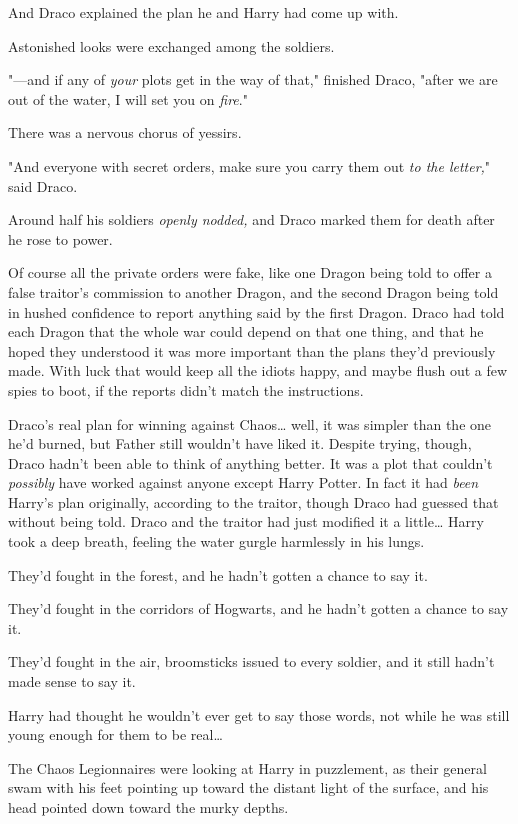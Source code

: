 And Draco explained the plan he and Harry had come up with.

Astonished looks were exchanged among the soldiers.

"---and if any of \emph{your} plots get in the way of that," finished Draco,
"after we are out of the water, I will set you on \emph{fire}."

There was a nervous chorus of yessirs.

"And everyone with secret orders, make sure you carry them out \emph{to the
letter,}" said Draco.

Around half his soldiers \emph{openly nodded,} and Draco marked them for death
after he rose to power.

Of course all the private orders were fake, like one Dragon being told to offer
a false traitor's commission to another Dragon, and the second Dragon being
told in hushed confidence to report anything said by the first Dragon. Draco
had told each Dragon that the whole war could depend on that one thing, and
that he hoped they understood it was more important than the plans they'd
previously made. With luck that would keep all the idiots happy, and maybe
flush out a few spies to boot, if the reports didn't match the instructions.

Draco's real plan for winning against Chaos{\ldots} well, it was simpler than
the one he'd burned, but Father still wouldn't have liked it. Despite trying,
though, Draco hadn't been able to think of anything better. It was a plot that
couldn't \emph{possibly} have worked against anyone except Harry Potter. In
fact it had \emph{been} Harry's plan originally, according to the traitor,
though Draco had guessed that without being told. Draco and the traitor had
just modified it a little{\ldots}
\later
Harry took a deep breath, feeling the water gurgle harmlessly in his lungs.

They'd fought in the forest, and he hadn't gotten a chance to say it.

They'd fought in the corridors of Hogwarts, and he hadn't gotten a chance to
say it.

They'd fought in the air, broomsticks issued to every soldier, and it still
hadn't made sense to say it.

Harry had thought he wouldn't ever get to say those words, not while he was
still young enough for them to be real{\ldots}

The Chaos Legionnaires were looking at Harry in puzzlement, as their general
swam with his feet pointing up toward the distant light of the surface, and his
head pointed down toward the murky depths.

